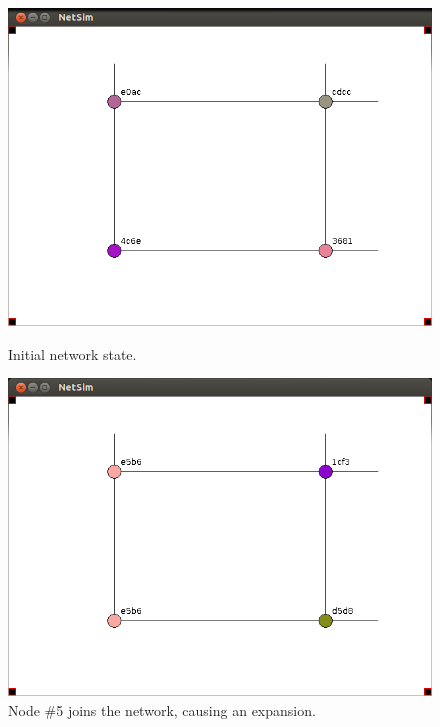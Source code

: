 \documentclass[ %
                    author={Luke Murray},
                supervisor={Dr. Simon Hollis},
                     title={Shadow Peer-to-Peer Networks},
                  subtitle={},
                    degree={MEng},
                      year={2013} ]{thesis}
\begin{document}
\begin{figure}[h]
    \centering
    \begin{minipage}[b]{0.45\linewidth}
        \centering
        \includegraphics[width=\linewidth]{sim_pics/balance_1.png}
        \caption{Initial network state.}
        \label{sim_balance1}
    \end{minipage}
    \hspace{0.5cm}
    \begin{minipage}[b]{0.45\linewidth}
        \centering
        \includegraphics[width=\linewidth]{sim_pics/expand_4.png}
        \caption{Node \#5 joins the network, causing an expansion.}
        \label{sim_balance2}
    \end{minipage}
\end{figure}
\end{document}

